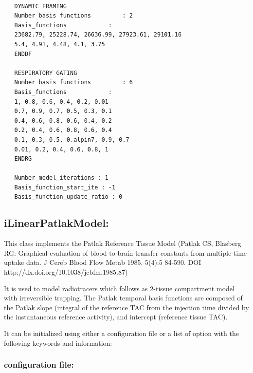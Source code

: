 \documentclass[a4paper, 11pt]{article}
\begin{document}
\begin{lstlisting}[label={sample},caption= Example of LinearModel initialization.]

   DYNAMIC FRAMING
   Number basis functions         : 2
   Basis_functions            :
   23682.79, 25228.74, 26636.99, 27923.61, 29101.16
   5.4, 4.91, 4.48, 4.1, 3.75
   ENDDF
   
   RESPIRATORY GATING
   Number basis functions         : 6
   Basis_functions            :  
   1, 0.8, 0.6, 0.4, 0.2, 0.01
   0.7, 0.9, 0.7, 0.5, 0.3, 0.1
   0.4, 0.6, 0.8, 0.6, 0.4, 0.2
   0.2, 0.4, 0.6, 0.8, 0.6, 0.4
   0.1, 0.3, 0.5, 0.alpin7, 0.9, 0.7
   0.01, 0.2, 0.4, 0.6, 0.8, 1
   ENDRG
   
   Number_model_iterations : 1
   Basis_function_start_ite : -1
   Basis_function_update_ratio : 0

\end{lstlisting}      
















\subsection{iLinearPatlakModel:} 
\label{ss_patlak}

This class implements the Patlak Reference Tissue Model (Patlak CS, Blasberg RG: Graphical evaluation of blood-to-brain transfer constants from multiple-time uptake data. J Cereb Blood Flow Metab 1985, 5(4):5 84-590. DOI http://dx.doi.org/10.1038/jcbfm.1985.87)
 
It is used to model radiotracers which follows as 2-tissue compartment model with irreversible trapping. The Patlak temporal basis functions are composed of the Patlak slope (integral of the reference TAC from the injection time divided by the instantaneous reference activity), and intercept (reference tissue TAC). 
   


It can be initialized using either a configuration file or a list of option with the following keywords and information:

\subsubsection{configuration file:} 
\label{sss_patlak_cfile} 
 
\end{document}
